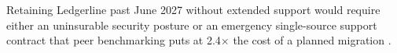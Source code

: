 \begin{tcolorbox}[notebox, title={\faExclamationTriangle\ Do-nothing is not neutral}]
Retaining Ledgerline past June 2027 without extended support would require either an
uninsurable security posture or an emergency single-source support contract that peer
benchmarking puts at 2.4$\times$ the cost of a planned migration \cite{castellan2025itspend}.
\end{tcolorbox}
